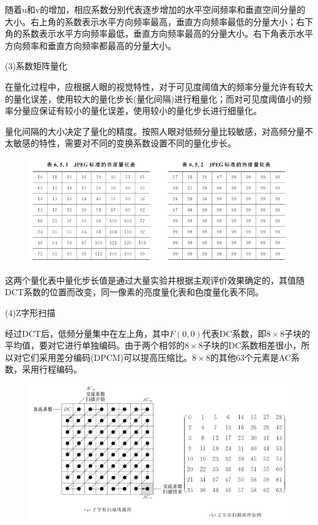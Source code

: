 \documentclass[11pt]{article}
\begin{document}
随着u和v的增加，相应系数分别代表逐步增加的水平空间频率和垂直空间分量的大小。右上角的系数表示水平方向频率最高，垂直方向频率最低的分量大小；右下角的系数表示水平方向频率最低，垂直方向频率最高的分量大小。右下角表示水平方向频率和垂直方向频率都最高的分量大小。

(3)系数矩阵量化

在量化过程中，应根据人眼的视觉特性，对于可见度阈值大的频率分量允许有较大的量化误差，使用较大的量化步长(量化间隔)进行粗量化；而对可见度阈值小的频率分量应保证有较小的量化误差，使用较小的量化步长进行细量化。

量化间隔的大小决定了量化的精度。按照人眼对低频分量比较敏感，对高频分量不太敏感的特性，需要对不同的变换系数设置不同的量化步长。

\begin{figure}[H]
	\centering
	\includegraphics[scale=0.6]{47}
\end{figure}

这两个量化表中量化步长值是通过大量实验并根据主观评价效果确定的，其值随DCT系数的位置而改变，同一像素的亮度量化表和色度量化表不同。

(4)Z字形扫描

经过DCT后，低频分量集中在左上角，其中$F(0,0)$代表DC系数，即$8\times 8$子块的平均值，要对它进行单独编码。由于两个相邻的$8\times 8$子块的DC系数相差很小，所以对它们采用差分编码(DPCM)可以提高压缩比。$8\times 8$的其他63个元素是AC系数，采用行程编码。
\begin{figure}[H]
	\centering
	\includegraphics[scale=0.6]{48}
\end{figure}
\end{document}
